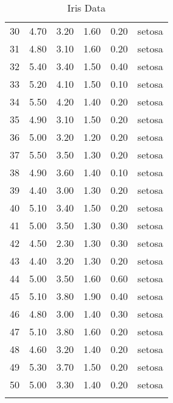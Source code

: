 \begin{longtable}{rrrrrl}
  30 & 4.70 & 3.20 & 1.60 & 0.20 & setosa \\ 
  31 & 4.80 & 3.10 & 1.60 & 0.20 & setosa \\ 
  32 & 5.40 & 3.40 & 1.50 & 0.40 & setosa \\ 
  33 & 5.20 & 4.10 & 1.50 & 0.10 & setosa \\ 
  34 & 5.50 & 4.20 & 1.40 & 0.20 & setosa \\ 
  35 & 4.90 & 3.10 & 1.50 & 0.20 & setosa \\ 
  36 & 5.00 & 3.20 & 1.20 & 0.20 & setosa \\ 
  37 & 5.50 & 3.50 & 1.30 & 0.20 & setosa \\ 
  38 & 4.90 & 3.60 & 1.40 & 0.10 & setosa \\ 
  39 & 4.40 & 3.00 & 1.30 & 0.20 & setosa \\ 
  40 & 5.10 & 3.40 & 1.50 & 0.20 & setosa \\ 
  41 & 5.00 & 3.50 & 1.30 & 0.30 & setosa \\ 
  42 & 4.50 & 2.30 & 1.30 & 0.30 & setosa \\ 
  43 & 4.40 & 3.20 & 1.30 & 0.20 & setosa \\ 
  44 & 5.00 & 3.50 & 1.60 & 0.60 & setosa \\ 
  45 & 5.10 & 3.80 & 1.90 & 0.40 & setosa \\ 
  46 & 4.80 & 3.00 & 1.40 & 0.30 & setosa \\ 
  47 & 5.10 & 3.80 & 1.60 & 0.20 & setosa \\ 
  48 & 4.60 & 3.20 & 1.40 & 0.20 & setosa \\ 
  49 & 5.30 & 3.70 & 1.50 & 0.20 & setosa \\ 
  50 & 5.00 & 3.30 & 1.40 & 0.20 & setosa \\ 
   \hline
\hline
\caption{Iris Data} 
\end{longtable}

